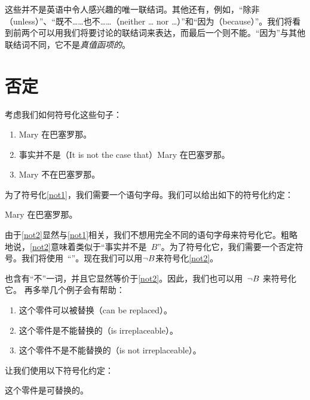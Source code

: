 这些并不是英语中令人感兴趣的唯一联结词。其他还有，例如，“除非（unless）”、“既不……也不……（neither \dots{} nor \dots）”和“因为（because）”。我们将看到前两个可以用我们将要讨论的联结词来表达，而最后一个则不能。“因为”与其他联结词不同，它不是\emph{真值函项的}。


\section{否定}

考虑我们如何符号化这些句子：


\begin{enumerate}
	\item\label{not1} Mary 在巴塞罗那。
	\item\label{not2} 事实并不是（It is not the case that）Mary 在巴塞罗那。
	\item\label{not3} Mary 不在巴塞罗那。
	\end{enumerate}


为了符号化\cref*{not1}，我们需要一个语句字母。我们可以给出如下的符号化约定：


\begin{ekey}
		\item[B] Mary 在巴塞罗那。
	\end{ekey}


由于\cref*{not2}显然与\cref*{not1}相关，我们不想用完全不同的语句字母来符号化它。粗略地说，\cref*{not2}意味着类似于“事实并不是~$B$”。为了符号化它，我们需要一个否定符号。我们将使用~“\enot”。现在我们可以用$\neg B$来符号化\cref*{not2}。

也含有“不”一词，并且它显然等价于\cref*{not2}。因此，我们也可以用~$\neg B$ 来符号化它。
再多举几个例子会有帮助：


\begin{enumerate}
		\item\label{not4} 这个零件可以被替换（can be replaced）。
		\item\label{not5} 这个零件是不能替换的（is irreplaceable）。
		\item\label{not5b} 这个零件不是不能替换的（is not irreplaceable）。
	\end{enumerate}


让我们使用以下符号化约定：


\begin{ekey}
		\item[R] 这个零件是可替换的。
	\end{ekey}



